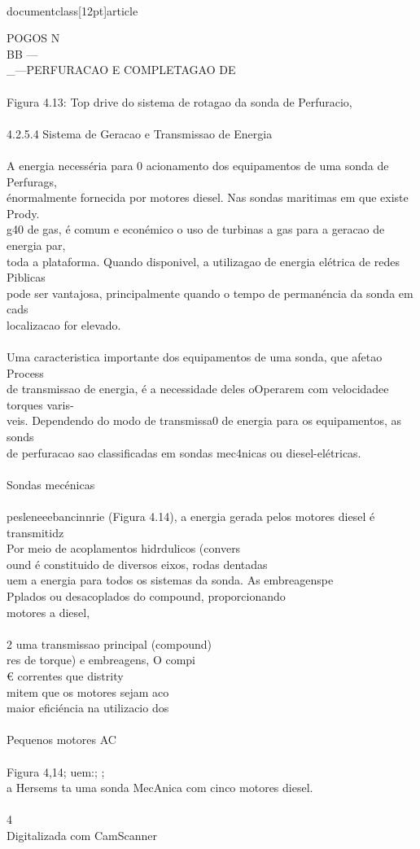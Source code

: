 \\documentclass[12pt]{article}
\begin{document}
{POGOS N\\
BB —\\_—PERFURACAO E COMPLETAGAO DE\\
\\
Figura 4.13: Top drive do sistema de rotagao da sonda de Perfuracio,\\
\\
4.2.5.4 Sistema de Geracao e Transmissao de Energia\\
\\
A energia necesséria para 0 acionamento dos equipamentos de uma sonda de Perfurags,\\
énormalmente fornecida por motores diesel. Nas sondas maritimas em que existe Prody.\\
g40 de gas, é comum e econémico o uso de turbinas a gas para a geracao de energia par,\\
toda a plataforma. Quando disponivel, a utilizagao de energia elétrica de redes Piblicas\\
pode ser vantajosa, principalmente quando o tempo de permanéncia da sonda em cads\\
localizacao for elevado.\\
\\
Uma caracteristica importante dos equipamentos de uma sonda, que afetao Process\\
de transmissao de energia, é a necessidade deles oOperarem com velocidadee torques varis-\\
veis. Dependendo do modo de transmissa0 de energia para os equipamentos, as sonds\\
de perfuracao sao classificadas em sondas mec4nicas ou diesel-elétricas.\\
\\
Sondas mecénicas\\
\\
pesleneeebancinnrie (Figura 4.14), a energia gerada pelos motores diesel é transmitidz\\
Por meio de acoplamentos hidrdulicos (convers\\
ound é constituido de diversos eixos, rodas dentadas\\
uem a energia para todos os sistemas da sonda. As embreagenspe\\
Pplados ou desacoplados do compound, proporcionando\\
motores a diesel,\\
\\
2 uma transmissao principal (compound)\\
res de torque) e embreagens, O compi\\
€ correntes que distrity\\
mitem que os motores sejam aco\\
maior eficiéncia na utilizacio dos\\
\\
Pequenos motores AC\\
\\
Figura 4,14; uem:; ;\\
a Hersems ta uma sonda MecAnica com cinco motores diesel.\\
\\
4\\
Digitalizada com CamScanner\\

}
\end{document}
